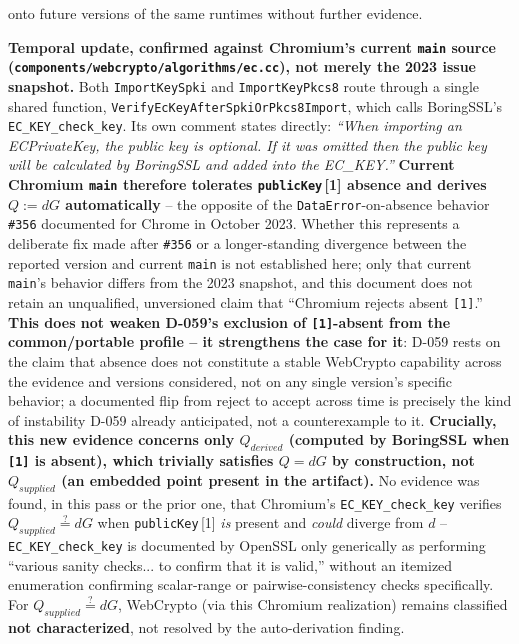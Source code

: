 \documentclass[11pt,a4paper]{article}
\begin{document}
onto future versions of the same runtimes without further evidence.

\textbf{Temporal update, confirmed against Chromium's current \texttt{main} source (\texttt{components/webcrypto/algorithms/ec.cc}), not merely the 2023 issue snapshot.} Both \texttt{ImportKeySpki} and \texttt{ImportKeyPkcs8} route through a single shared function, \texttt{VerifyEcKeyAfterSpkiOrPkcs8Import}, which calls BoringSSL's \texttt{EC\_KEY\_check\_key}. Its own comment states directly: \emph{``When importing an ECPrivateKey, the public key is optional. If it was omitted then the public key will be calculated by BoringSSL and added into the EC\_KEY.''} \textbf{Current Chromium \texttt{main} therefore tolerates \texttt{publicKey}\,[1] absence and derives $Q:=dG$ automatically} -- the opposite of the \texttt{DataError}-on-absence behavior \texttt{\#356} documented for Chrome in October 2023. Whether this represents a deliberate fix made after \texttt{\#356} or a longer-standing divergence between the reported version and current \texttt{main} is not established here; only that current \texttt{main}'s behavior differs from the 2023 snapshot, and this document does not retain an unqualified, unversioned claim that ``Chromium rejects absent \texttt{[1]}.'' \textbf{This does not weaken D-059's exclusion of \texttt{[1]}-absent from the common/portable profile -- it strengthens the case for it}: D-059 rests on the claim that absence does not constitute a stable WebCrypto capability across the evidence and versions considered, not on any single version's specific behavior; a documented flip from reject to accept across time is precisely the kind of instability D-059 already anticipated, not a counterexample to it. \textbf{Crucially, this new evidence concerns only $Q_{derived}$ (computed by BoringSSL when \texttt{[1]} is absent), which trivially satisfies $Q=dG$ by construction, not $Q_{supplied}$ (an embedded point present in the artifact).} No evidence was found, in this pass or the prior one, that Chromium's \texttt{EC\_KEY\_check\_key} verifies $Q_{supplied}\overset{?}{=}dG$ when \texttt{publicKey}\,[1] \emph{is} present and \emph{could} diverge from $d$ -- \texttt{EC\_KEY\_check\_key} is documented by OpenSSL only generically as performing ``various sanity checks... to confirm that it is valid,'' without an itemized enumeration confirming scalar-range or pairwise-consistency checks specifically. For $Q_{supplied}\overset{?}{=}dG$, WebCrypto (via this Chromium realization) remains classified \textbf{not characterized}, not resolved by the auto-derivation finding.
\end{document}
